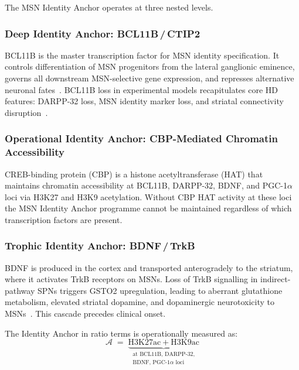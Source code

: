 \documentclass[12pt,a4paper]{article}
\newcommand{\IA}{\mathcal{A}}
\begin{document}
The MSN Identity Anchor operates at three nested levels.

\subsubsection{Deep Identity Anchor: BCL11B\,/\,CTIP2}

BCL11B is the master transcription factor for MSN identity
specification. It controls differentiation of MSN progenitors
from the lateral ganglionic eminence, governs all downstream
MSN-selective gene expression, and represses alternative
neuronal fates~\cite{Arlotta2008}. BCL11B loss in
experimental models recapitulates core HD features:
DARPP-32 loss, MSN identity marker loss, and striatal
connectivity disruption~\cite{Desplats2008,Tang2012}.

\subsubsection{Operational Identity Anchor:
CBP-Mediated Chromatin Accessibility}

CREB-binding protein (CBP) is a histone acetyltransferase
(HAT) that maintains chromatin accessibility at BCL11B,
DARPP-32, BDNF, and PGC-1$\alpha$ loci via H3K27
and H3K9 acetylation. Without CBP HAT activity at these
loci the MSN Identity Anchor programme cannot be maintained
regardless of which transcription factors are present.

\subsubsection{Trophic Identity Anchor: BDNF\,/\,TrkB}

BDNF is produced in the cortex and transported anterogradely
to the striatum, where it activates TrkB receptors on MSNs.
Loss of TrkB signalling in indirect-pathway SPNs triggers
GSTO2 upregulation, leading to aberrant glutathione
metabolism, elevated striatal dopamine, and dopaminergic
neurotoxicity to MSNs~\cite{Oxford2024}. This cascade
precedes clinical onset.

\medskip
The Identity Anchor in ratio terms is operationally
measured as:
\begin{equation}
  \IA \;=\;
  \underbrace{
    \mathrm{H3K27ac} + \mathrm{H3K9ac}
  }_{\substack{
    \text{at BCL11B, DARPP-32,}\\
    \text{BDNF, PGC-1}\alpha\text{ loci}
  }}
  \label{eq:anchor}
\end{equation}
\end{document}
